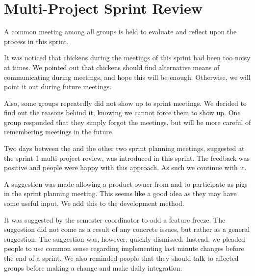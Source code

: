 \section{Multi-Project Sprint Review}\label{sec:s2_multiprj_review}
A common meeting among all groups is held to evaluate and reflect upon the process in this sprint.

It was noticed that chickens during the meetings of this sprint had been too noisy at times. We pointed out that chickens should find alternative means of communicating during meetings, and hope this will be enough. Otherwise, we will point it out during future meetings.

Also, some groups repeatedly did not show up to sprint meetings. We decided to find out the reasons behind it, knowing we cannot force them to show up. One group responded that they simply forgot the meetings, but will be more careful of remembering meetings in the future.

Two days between the \gui and the other two sprint planning meetings, suggested at the sprint 1 multi-project review, was introduced in this sprint. The feedback was positive and people were happy with this approach. As such we continue with it.

A suggestion was made allowing a product owner from \db and \bd to participate as pigs in the \gui sprint planning meeting. This seems like a good idea as they may have some useful input. We add this to the development method.

It was suggested by the semester coordinator to add a feature freeze. The suggestion did not come as a result of any concrete issues, but rather as a general suggestion. The suggestion was, however, quickly dismissed. Instead, we pleaded people to use common sense regarding implementing last minute changes before the end of a sprint. We also reminded people that they should talk to affected groups before making a change and make daily integration.
